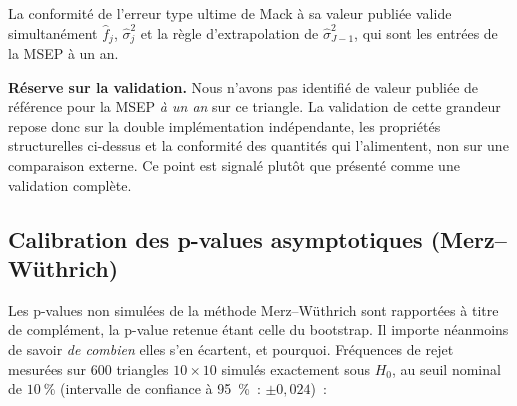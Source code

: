 \documentclass[a4paper,11pt]{article}
\begin{document}
\noindent
La conformité de l'erreur type ultime de Mack à sa valeur publiée valide
simultanément $\hat f_j$, $\hat\sigma_j^2$ et la règle d'extrapolation de
$\hat\sigma_{J-1}^2$, qui sont les entrées de la MSEP à un an.

\medskip
\begin{encadre}
\textbf{Réserve sur la validation.} Nous n'avons pas identifié de valeur publiée
de référence pour la MSEP \emph{à un an} sur ce triangle. La validation de cette
grandeur repose donc sur la double implémentation indépendante, les propriétés
structurelles ci-dessus et la conformité des quantités qui l'alimentent, non sur
une comparaison externe. Ce point est signalé plutôt que présenté comme une
validation complète.
\end{encadre}

\subsection{Calibration des p-values asymptotiques (Merz--Wüthrich)}
\label{sec:calib-asympt-mw}

Les p-values non simulées de la méthode Merz--Wüthrich sont rapportées à titre de
complément, la p-value retenue étant celle du bootstrap. Il importe néanmoins de
savoir \emph{de combien} elles s'en écartent, et pourquoi. Fréquences de rejet
mesurées sur 600 triangles $10\times10$ simulés exactement sous $H_0$, au seuil
nominal de $10~\%$ (intervalle de confiance à 95~\%~: $\pm 0{,}024$)~:
\end{document}
